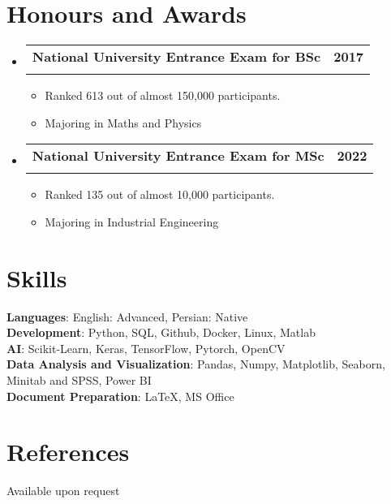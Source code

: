 \documentclass[letterpaper,11pt]{article}
\makeatletter
\newcommand{\resumeItem}[1]{
  \item\small{
    {#1 \vspace{-2pt}}
  }
}
\newcommand{\resumeSubheading}[4]{
  \vspace{-2pt}\item
    \begin{tabular*}{1.0\textwidth}[t]{l@{\extracolsep{\fill}}r}
      \textbf{#1} & \textbf{\small #2} \\
      \textit{\small#3} & \textit{\small #4} \\
    \end{tabular*}\vspace{-7pt}
}
\newcommand{\resumeSubHeadingListStart}{\begin{itemize}[leftmargin=0.0in, label={}]}
\newcommand{\resumeSubHeadingListEnd}{\end{itemize}}
\newcommand{\resumeItemListStart}{\begin{itemize}}
\newcommand{\resumeItemListEnd}{\end{itemize}\vspace{-5pt}}
\makeatother
\begin{document}
\section{Honours and Awards}
    \resumeSubHeadingListStart
        \resumeSubheading{National University Entrance Exam for BSc}{2017}{}{}
        \vspace{-15pt}
        \resumeItemListStart
            \resumeItem{Ranked 613 out of almost 150,000 participants.}
            \resumeItem{Majoring in Maths and Physics}
        \resumeItemListEnd
    \resumeSubHeadingListEnd
    \vspace{-13pt}
    \resumeSubHeadingListStart
        \resumeSubheading{National University Entrance Exam for MSc}{2022}{}{}
        \vspace{-15pt}
        \resumeItemListStart
            \resumeItem{Ranked 135 out of almost 10,000 participants.}
            \resumeItem{Majoring in Industrial Engineering}
        \resumeItemListEnd
    \resumeSubHeadingListEnd

\vspace{-15pt}

\section{Skills}
 \begin{itemize}[leftmargin=0.15in, label={}]
    \small{\item{
     \textbf{Languages}{: English: Advanced, Persian: Native} \\
     \textbf{Development}{: Python, SQL, Github, Docker, Linux, Matlab} \\
     \textbf{AI}{: Scikit-Learn, Keras, TensorFlow, Pytorch, OpenCV} \\
     \textbf{Data Analysis and Visualization}{: Pandas, Numpy, Matplotlib, Seaborn, Minitab and SPSS, Power BI} \\
     \textbf{Document Preparation}{: \LaTeX, MS Office} \\
    }}
 \end{itemize}
 \vspace{-16pt}

\section{References}
Available upon request
\vspace{-15pt}
\end{document}
